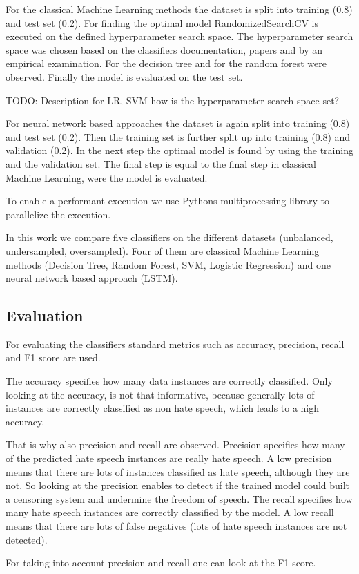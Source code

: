 For the classical Machine Learning methods the dataset is split into training (0.8) and test set (0.2). For finding the optimal model Randomized\-SearchCV is executed on the defined hyperparameter search space. The hyperparameter search space was chosen based on the classifiers doc\-u\-men\-ta\-tion, papers and by an empirical examination. For the decision tree \cite{mantovani2019empirical} and for the random forest \cite{probstHyperparametersTuningStrategies2019} were observed. Finally the model is evaluated on the test set.

TODO: Description for LR, SVM how is the hyperparameter search space set?

For neural network based approaches the dataset is again split into training (0.8) and test set (0.2). Then the training set is further split up into training (0.8) and validation (0.2). In the next step the optimal model is found by using the training and the validation set. The final step is equal to the final step in classical Machine Learning, were the model is evaluated.

To enable a performant execution we use Pythons multiprocessing library to parallelize the execution.

In this work we compare five classifiers on the different datasets (unbalanced, undersampled, oversampled). Four of them are classical Machine Learning methods (Decision Tree, Random Forest, SVM, Logistic Regression) and one neural network based approach (LSTM).


\subsection{Evaluation}
\label{ch:approachF}

For evaluating the classifiers standard metrics such as accuracy, precision, recall and F1 score are used.

The accuracy specifies how many data instances are correctly classified. Only looking at the accuracy, is not that informative, because generally lots of instances are correctly classified as non hate speech, which leads to a high accuracy.

That is why also precision and recall are observed. Precision specifies how many of the predicted hate speech instances are really hate speech. A low precision means that there are lots of instances classified as hate speech, although they are not. So looking at the precision enables to detect if the trained model could built a censoring system and undermine the freedom of speech. The recall specifies how many hate speech instances are correctly classified by the model. A low recall means that there are lots of false negatives (lots of hate speech instances are not detected).

For taking into account precision and recall one can look at the F1 score. 

